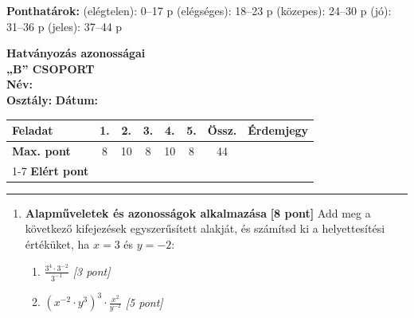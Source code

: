 \documentclass[a4paper,11pt]{article}
\begin{document}
\begin{enumerate}
\vfill
\noindent
\begin{center}
\small
\textbf{Ponthatárok:}  (elégtelen): 0--17 p  (elégséges): 18--23 p  (közepes): 24--30 p  (jó): 31--36 p  (jeles): 37--44 p
\end{center}

\newpage


\noindent
\begin{minipage}[t]{0.45\textwidth}
  \vspace{0pt}
  
  {\Large\textbf{Hatványozás azonosságai}}\\[2mm]
  {\large\textbf{„B” CSOPORT}}\\[2mm]
  \textbf{Név:} \underline{\hspace{4.5cm}}\\[2mm]
  \textbf{Osztály:} \underline{\hspace{1.5cm}} \quad \textbf{Dátum:} \underline{\hspace{2cm}}
\end{minipage}
\hfill
\begin{minipage}[t]{0.53\textwidth}
  \vspace{0pt}
  \begin{flushright}
  {\small
  \begin{tabular}{|l|c|c|c|c|c||c||c|}
    \hline
    \textbf{Feladat} & 1. & 2. & 3. & 4. & 5. & \textbf{Össz.} & \textbf{Érdemjegy} \\ \hline
    \textbf{Max. pont} & 8 & 10 & 8 & 10 & 8 & 44 & \\ \cline{1-7}
    \textbf{Elért pont} &  &  &  &  &  &  & & \\ \hline
  \end{tabular}
  }
  \end{flushright}
\end{minipage}
\vspace{2mm}
\hrule
\vspace{4mm}

\begin{enumerate}
  \item \textbf{Alapműveletek és azonosságok alkalmazása} \hfill \textbf{[8 pont]}
  Add meg a következő kifejezések egyszerűsített alakját, és számítsd ki a helyettesítési értéküket, ha $x = 3$ és $y = -2$:
  \begin{enumerate}
    \item $\frac{3^4 \cdot 3^{-2}}{3^{-1}}$ \hfill \textit{[3 pont]}
    \item $(x^{-2} \cdot y^3)^3 \cdot \frac{x^2}{y^{-2}}$ \hfill \textit{[5 pont]}
  \end{enumerate}


\end{enumerate}
\end{enumerate}
\end{document}
